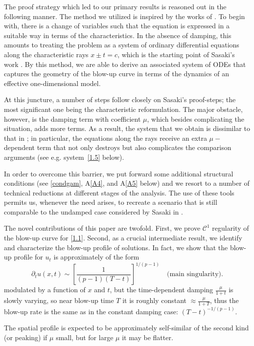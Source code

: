 \documentclass[
  sn-mathphys-num,
  colorlinks,
  linkcolor=darkmagenta,
  citecolor=rufous,
  urlcolor=zaffre,
  hypertexnames=false
]{sn-jnl}
\numberwithin{equation}{section}
\begin{document}
The proof strategy which led to our primary results is reasoned out in the following manner. The method we utilized is inspired by the works of \cite{Caffarelli1985, Caffarelli1986, Sasaki2019}. To begin with, there is a change of variables such that the equation is expressed in a suitable way in terms of the characteristics. In the absence of damping, this amounts to treating the problem as a system of ordinary differential equations along the characteristic rays 
$x\pm t=c$, which is the starting point of Sasaki's work \cite{Sasaki2018, Sasaki2019}. By this method, we are able to derive an associated system of ODEs that captures the geometry of the blow-up curve in terms of the dynamics of an effective one-dimensional model.



At this juncture, a number of steps follow closely on Sasaki's proof-steps; the most significant one being the characteristic reformulation. The major obstacle, however, is the damping term with coefficient $\mu$, which besides complicating the situation, adds more terms. As a result, the system that we obtain is dissimilar to that in \cite{Sasaki2019}; in particular, the equations along the rays receive an extra $\mu-$dependent term that not only destroys but also complicates the comparison arguments (see e.g. system~\eqref{1.5} below).


In order to overcome this barrier, we put forward some additional structural conditions (see \eqref{condgam}, A\ref{A4}, and A\ref{A5} below) and we resort to a number of technical reductions at different stages of the analysis. The use of these tools permits us, whenever the need arises, to recreate a scenario that is still comparable to the undamped case considered by Sasaki in \cite{Sasaki2019}.

The novel contributions of this paper are twofold. First, we prove $\mathcal{C}^1$ regularity of the blow-up curve for \eqref{1.1}. Second, as a crucial intermediate result, we identify and characterize the blow-up profile of solutions. In fact, we show that the blow-up profile for $u_t$ is approximately of the form
$$
\partial_t u(x,t) \sim \left[ \frac{1}{(p-1)(T-t)} \right]^{1/(p-1)} \quad \text{(main singularity)}.
$$
modulated by a function of $x$ and $t$, but the time-dependent damping $\frac{\mu}{1+t}$ is slowly varying, so near blow-up time $T$ it is roughly constant $\approx \frac{\mu}{1+T}$, thus the blow-up rate is the same as in the constant damping case: $(T-t)^{-1/(p-1)}$.

The spatial profile is expected to be approximately self-similar of the second kind (or peaking) if $\mu$ small, but for large $\mu$ it may be flatter.
\end{document}
